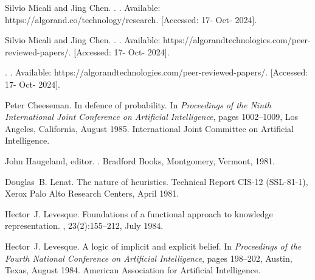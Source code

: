 \documentclass{article}
\begin{document}
%
%
\begin{thebibliography}{}

Silvio Micali and Jing Chen.
.
\newblock [Online]. Available: https://algorand.co/technology/research. [Accessed: 17- Oct- 2024].

Silvio Micali and Jing Chen.
.
\newblock [Online]. Available: https://algorandtechnologies.com/peer-reviewed-papers/. [Accessed: 17- Oct- 2024].

.
\newblock [Online]. Available: https://algorandtechnologies.com/peer-reviewed-papers/. [Accessed: 17- Oct- 2024].

Peter Cheeseman.
\newblock In defence of probability.
\newblock In {\em Proceedings of the Ninth International Joint Conference on
  Artificial Intelligence}, pages 1002--1009, Los Angeles, California, August
  1985. International Joint Committee on Artificial Intelligence.

John Haugeland, editor.
.
\newblock Bradford Books, Montgomery, Vermont, 1981.

Douglas~B. Lenat.
\newblock The nature of heuristics.
\newblock Technical Report CIS-12 (SSL-81-1), Xerox Palo Alto Research Centers,
  April 1981.

Hector~J. Levesque.
\newblock Foundations of a functional approach to knowledge representation.
, 23(2):155--212, July 1984.

Hector~J. Levesque.
\newblock A logic of implicit and explicit belief.
\newblock In {\em Proceedings of the Fourth National Conference on Artificial
  Intelligence}, pages 198--202, Austin, Texas, August 1984. American
  Association for Artificial Intelligence.

\end{thebibliography}
\end{document}

